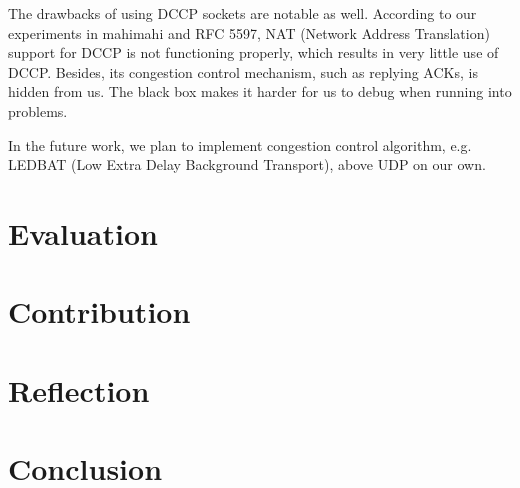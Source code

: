 \documentclass{sig-alternate-10pt}
\begin{document}
The drawbacks of using DCCP sockets are notable as well. According to our experiments in mahimahi and RFC 5597, NAT (Network Address Translation) support for DCCP is not functioning properly, which results in very little use of DCCP. Besides, its congestion control mechanism, such as replying ACKs, is hidden from us. The black box makes it harder for us to debug when running into problems.

In the future work, we plan to implement congestion control algorithm, e.g. LEDBAT (Low Extra Delay Background Transport), above UDP on our own.

\section{Evaluation}

\section{Contribution}

\section{Reflection}

\section{Conclusion}

 

\end{document}
